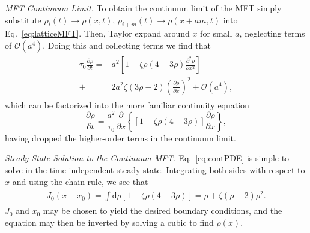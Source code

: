 \documentclass[
reprint,
 amsmath,amssymb,
 aps,
 prl,
]{revtex4-1}
\newcommand{\partDeriv}[2]{\frac{\partial #1}{\partial #2}}
\begin{document}
\textit{MFT Continuum Limit.} To obtain the continuum limit of the MFT simply substitute $\rho_i(t) \rightarrow \rho(x, t)$, $\rho_{i+m}(t) \rightarrow \rho(x + am, t)$ into Eq.~\ref{eq:latticeMFT}.
Then, Taylor expand around $x$ for small $a$, neglecting terms of $\mathcal{O}(a^4)$. Doing this and collecting terms we find that
\begin{align}
 \begin{split}
  \tau_0 \partDeriv{\rho}{t} =& a^2 \left[ 1-\zeta \rho (4-3\rho) \partDeriv{^2 \rho}{x^2}  \right] \\
  +& 2 a^2 \zeta (3\rho-2) \left(\partDeriv{\rho}{x}\right)^2 + \mathcal{O}(a^4) ,
 \end{split}
\end{align}
which can be factorized into the more familiar continuity equation
\begin{equation}
\label{eq:contPDE}
 \partDeriv{\rho}{t} = \frac{a^2}{\tau_0} \partDeriv{}{x} \left\{ \left[1 - \zeta \rho\left(4-3\rho\right) \right] \partDeriv{\rho}{x} \right\},
\end{equation}
having dropped the higher-order terms in the continuum limit.

\textit{Steady State Solution to the Continuum MFT.} Eq.~\ref{eq:contPDE} is simple to solve in the time-independent steady state. Integrating both sides with respect to $x$ and using the chain rule, we see that
\begin{align}
 \begin{split}
  J_0 (x-x_0) = \int \! \! \mathrm{d} \rho  \left[1 - \zeta \rho\left(4-3\rho\right) \right]  = \rho + \zeta (\rho - 2) \rho^2 .
 \end{split}
\end{align}
$J_0$ and $x_0$ may be chosen to yield the desired boundary conditions, and the equation may then be inverted by solving a cubic to find $\rho(x)$.
\end{document}

